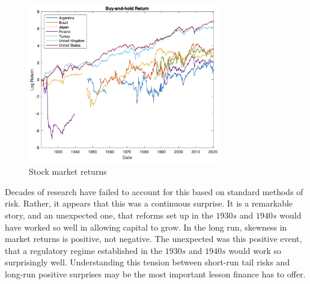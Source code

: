 \begin{figure}[h]
    \centering
    \includegraphics[width=0.75\textwidth]{fig19.png}
    \caption{Stock market returns \citep{binsbergen2023united}}
    \label{fig:fig19}
\end{figure}

Decades of research have failed to account for this based on standard methods of risk. Rather, it appears that this was a continuous surprise. It is a remarkable story, and an unexpected one, that reforms set up in the $1930s$ and $1940s$ would have worked so well in allowing capital to grow. In the long run, skewness in market returns is positive, not negative. The unexpected was this positive event, that a regulatory regime established in the $1930s$ and $1940s$ would work so surprisingly well. Understanding this tension between short-run tail risks and long-run positive surprises may be the most important lesson finance has to offer. 
